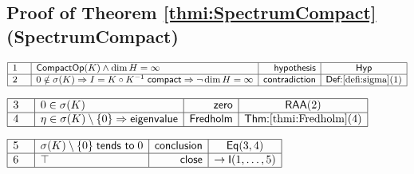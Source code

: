 \documentclass[11pt,reqno]{amsart}
\begin{document}
	\subsection*{Proof of Theorem \protect\ref{thmi:SpectrumCompact} (\textsf{SpectrumCompact})}
	\noindent$\begin{array}{|m{0.5cm}|l|r|c|}
	\hline
	1 & \mathsf{CompactOp}(K)\wedge\dim H=\infty & \mathsf{hypothesis} & \mathsf{Hyp} \\ \hline
	2 & 0\notin\sigma(K)\Rightarrow I=K\circ K^{-1}\;\mathsf{compact}\Rightarrow\neg\dim H=\infty & \mathsf{contradiction} & \textsf{Def:}\ref{defi:sigma}(1) \\ \hline
	\end{array}$
	\par\nointerlineskip\noindent$\begin{array}{|m{0.5cm}|l|r|c|}
	\hline
	3 & 0\in\sigma(K) & \mathsf{zero} & \mathsf{RAA}(2) \\ \hline
	4 & \eta\in\sigma(K)\setminus\{0\}\Rightarrow\mathsf{eigenvalue} & \mathsf{Fredholm} & \textsf{Thm:}\ref{thmi:Fredholm}(4) \\ \hline
	\end{array}$
	\par\nointerlineskip\noindent$\begin{array}{|m{0.5cm}|l|r|c|}
	\hline
	5 & \sigma(K)\setminus\{0\}\;\mathsf{tends\ to}\;0 & \mathsf{conclusion} & \mathsf{Eq}(3,4) \\ \hline
	6 & \top & \mathsf{close} & \to\mathsf{I}(1,\dots,5) \\ \hline
	\end{array}$
	\medskip
	
\end{document}

